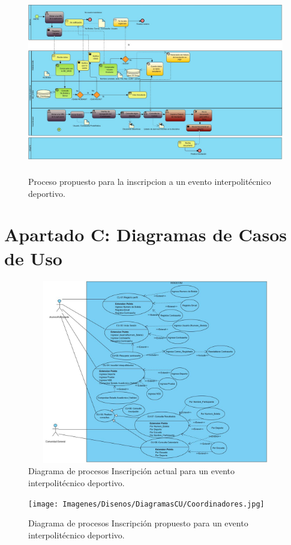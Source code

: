 		\begin{figure}[hbt!]
			\centering
			\includegraphics[width=16cm, height=8cm]{Imagenes/Disenos/ProcesoInscripcionPropuesto.jpg}
			\caption{Proceso propuesto para la inscripcion a un evento interpolitécnico deportivo.}
			\label{ProcesoInscripcionPropuesto}
		\end{figure}
	
	\pagebreak
	
	\section{Apartado C: Diagramas de Casos de Uso}
		\begin{figure}[hbt!]
			\centering
			\includegraphics[width=16cm, height=8cm]{Imagenes/Disenos/DiagramasCU/Alumno.jpg}
			\caption{Diagrama de procesos Inscripción actual para un evento interpolitécnico deportivo.}
			\label{Inscripcion}
		\end{figure}
		\begin{figure}[hbt!]
			\centering
			\texttt{[image: Imagenes/Disenos/DiagramasCU/Coordinadores.jpg]}
			\caption{Diagrama de procesos Inscripción propuesto para un evento interpolitécnico deportivo.}
			\label{Inscripcion}
		\end{figure}
	\pagebreak

